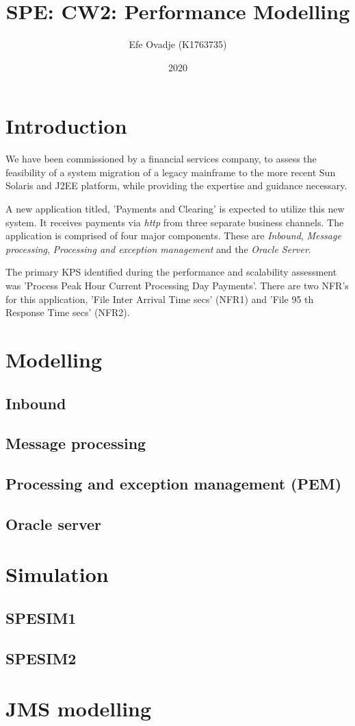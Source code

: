 \documentclass[a4paper,11pt]{report}
\title{SPE: CW2: Performance Modelling}
\author{Efe Ovadje (K1763735)}
\date{2020}
\begin{document}
\maketitle

\chapter*{Introduction}
We have been commissioned
by a financial services company,
to assess the feasibility of a system migration of a
legacy mainframe to the more recent Sun Solaris and
J2EE platform, while providing the expertise and guidance necessary.

A new application titled, 'Payments and Clearing' is expected to
utilize this new system.
It receives payments via \textit{http} from three separate business channels.
The application is comprised of four major components.
These are \textit{Inbound}, \textit{Message processing},
\textit{Processing and exception management} and the \textit{Oracle Server}.

The primary KPS identified during the performance and
scalability assessment was 'Process Peak Hour Current Processing Day Payments'.
There are two NFR's for this application,
'File Inter Arrival Time secs' (NFR1) and
'File 95 th Response Time secs' (NFR2).

\chapter*{Modelling}

\section*{Inbound}

\section*{Message processing}

\section*{Processing and exception management (PEM)}

\section*{Oracle server}

\chapter*{Simulation}

\section*{SPESIM1}

\section*{SPESIM2}

\chapter*{JMS modelling}
\end{document}
